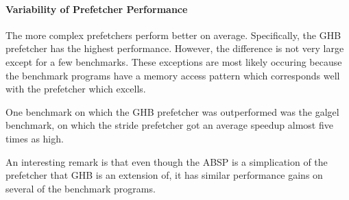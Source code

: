 
\paragraph{Variability of Prefetcher Performance}
\label{par:varprefperf}

The more complex prefetchers perform better on average. Specifically, the GHB
prefetcher has the highest performance. However, the difference is not
very large except for a few benchmarks. These exceptions are most
likely occuring because the benchmark programs have a memory access pattern
which corresponds well with the prefetcher which excells.


One benchmark on which the GHB prefetcher was outperformed was the
galgel benchmark, on which the stride prefetcher got an average
speedup almost five times as high. 

An interesting remark is that even though the ABSP is a simplication of the prefetcher that GHB is an extension of, it has similar performance gains on several of the benchmark programs.  


